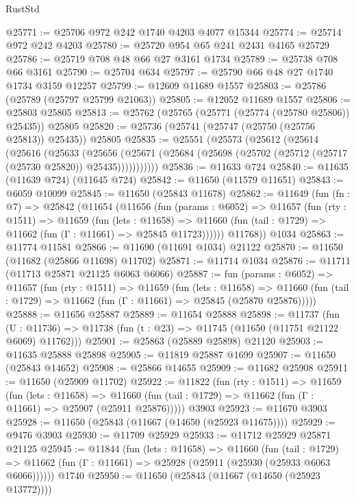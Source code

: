 \begin{lexlean}{RustStd}
\begin{coremodule}
@25771 := @25706 @972 @242 @1740 @4203 @4077 @15344
@25774 := @25714 @972 @242 @4203
@25780 := @25720 @954 @65 @241 @2431 @4165 @25729
@25786 := @25719 @708 @48 @66 @27 @3161 @1734
@25789 := @25738 @708 @66 @3161
@25790 := @25704 @634
@25797 := @25790 @66 @48 @27 @1740 @1734 @3159 @12257
@25799 := @12609 @11689 @1557
@25803 := @25786 (@25789 (@25797 @25799 @21063))
@25805 := @12052 @11689 @1557
@25806 := @25803 @25805
@25813 := @25762 (@25765 (@25771 (@25774 (@25780 @25806)) @25435)) @25805
@25820 := @25736 (@25741 (@25747 (@25750 (@25756 @25813)) @25435)) @25805
@25835 := @25551
    (@25573
      (@25612
        (@25614
          (@25616
            (@25633
              (@25656
                (@25671 (@25684 (@25698 (@25702 (@25712 (@25717 (@25730 @25820)) @25435)))))))))))
@25836 := @11633 @724
@25840 := @11635 (@11639 @724) (@11645 @724)
@25842 := @11650 (@11579 @11651)
@25843 := @6059 @10099
@25845 := @11650 (@25843 @11678)
@25862 := @11649
    (fun (fn : @7) =>
    @25842
      (@11654
        (@11656
          (fun (params : @6052) =>
          @11657
            (fun (rty : @1511) =>
            @11659
              (fun (lets : @11658) =>
              @11660 (fun (tail : @1729) => @11662 (fun (Γ : @11661) => @25845 @11723))))))
        @11768))
    @1034
@25863 := @11774 @11581
@25866 := @11690 (@11691 @1034) @21122
@25870 := @11650 (@11682 (@25866 @11698) @11702)
@25871 := @11714 @1034
@25876 := @11711 (@11713 @25871 @21125 @6063 @6066)
@25887 := fun (params : @6052) =>
  @11657
    (fun (rty : @1511) =>
    @11659
      (fun (lets : @11658) =>
      @11660 (fun (tail : @1729) => @11662 (fun (Γ : @11661) => @25845 (@25870 @25876)))))
@25888 := @11656 @25887
@25889 := @11654 @25888
@25898 := @11737
    (fun (U : @11736) => @11738 (fun (t : @23) => @11745 (@11650 (@11751 @21122 @6069) @11762)))
@25901 := @25863 (@25889 @25898) @21120
@25903 := @11635 @25888 @25898
@25905 := @11819 @25887 @1699
@25907 := @11650 (@25843 @14652)
@25908 := @25866 @14655
@25909 := @11682 @25908
@25911 := @11650 (@25909 @11702)
@25922 := @11822
    (fun (rty : @1511) =>
    @11659
      (fun (lets : @11658) =>
      @11660 (fun (tail : @1729) => @11662 (fun (Γ : @11661) => @25907 (@25911 @25876)))))
    @3903
@25923 := @11670 @3903
@25928 := @11650 (@25843 (@11667 (@14650 (@25923 @11675))))
@25929 := @9476 @3903
@25930 := @11709 @25929
@25933 := @11712 @25929 @25871 @21125
@25945 := @11844
    (fun (lets : @11658) =>
    @11660
      (fun (tail : @1729) =>
      @11662 (fun (Γ : @11661) => @25928 (@25911 (@25930 (@25933 @6063 @6066))))))
    @1740
@25950 := @11650 (@25843 (@11667 (@14650 (@25923 @13772))))

\end{coremodule}
\end{lexlean}

